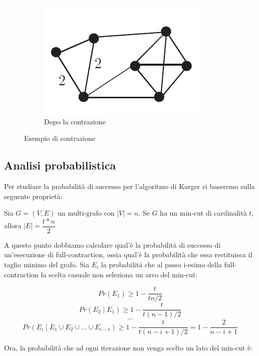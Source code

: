 \begin{figure}[h]
\begin{subfigure}[b]{0.3\textwidth}
             \includegraphics[width=\textwidth]{./images/after-contraction.png}
             \caption{Dopo la contrazione}
             \label{fig:after-contraction}
     \end{subfigure}
     \caption{Esempio di contrazione}
     \label{fig:contraction-example}
\end{figure}

\subsection{Analisi probabilistica}
\label{sub:karger-success-probability}

Per studiare la probabilità di successo per l'algoritmo di Karger ci baseremo sulla seguente proprietà:

\begin{prop}
Sia $ G = (V, E) $ un multi-grafo con $ \lvert V \rvert = n$. Se $G$ ha un min-cut di cardinalità $t$, allora $\lvert E \rvert = \dfrac{t * n}{2}$
\end{prop}

A questo punto dobbiamo calcolare qual'è la probabilità di successo di un'esecuzione di full-contraction, ossia qual'è la probabilità che essa restituisca il taglio minimo del grafo.
Sia $E_{i}$ la probabilità che al passo i-esimo della full-contraction la scelta casuale non seleziona un arco del min-cut:

$$Pr(E_{1}) \geq 1-\dfrac{t}{t n/2}$$
$$Pr(E_{2} \mid E_{1}) \geq 1-\dfrac{t}{t (n-1)/2}$$
$$...$$
$$Pr(E_{i} \mid E_{1} \cup E_{2} \cup ... \cup E_{i-1}) \geq 1-\dfrac{t}{t (n-i+1)/2} = 1 - \dfrac{2}{n-i+1}$$

Ora, la probabilità che ad ogni iterazione non venga scelto un lato del min-cut è:

